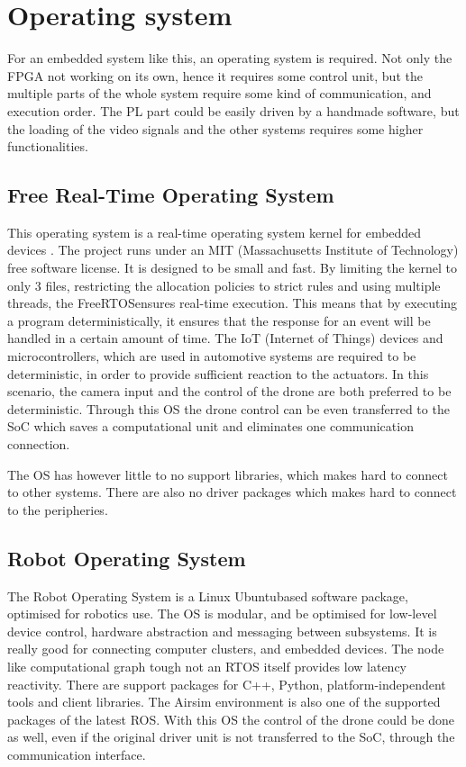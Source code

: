 \section{Operating system} %
For an embedded system like this, an operating system is required.
Not only the FPGA not working on its own, hence it requires some control unit, but the multiple parts of the whole system require some kind of communication, and execution order.
The PL part could be easily driven by a handmade software, but the loading of the video signals and the other systems requires some higher functionalities.

\subsection{Free Real-Time Operating System} %
This operating system is a real-time operating system kernel for embedded devices \cite{FreeROTS}.
The project runs under an MIT (Massachusetts Institute of Technology) free software license.
It is designed to be small and fast.
By limiting the kernel to only 3 files, restricting the allocation policies to strict rules and using multiple threads, the FreeRTOS\texttrademark ensures real-time execution.
This means that by executing a program deterministically, it ensures that the response for an event will be handled in a certain amount of time.
The IoT (Internet of Things) devices and microcontrollers, which are used in automotive systems are required to be deterministic, in order to provide sufficient reaction to the actuators.
In this scenario, the camera input and the control of the drone are both preferred to be deterministic.
Through this OS the drone control can be even transferred to the SoC which saves a computational unit and eliminates one communication connection.

The OS has however little to no support libraries, which makes hard to connect to other systems.
There are also no driver packages which makes hard to connect to the peripheries.

\subsection{Robot Operating System} %
The Robot Operating System\texttrademark \cite{ROS} is a Linux Ubuntu\texttrademark based software package, optimised for robotics use.
The OS is modular, and be optimised for low-level device control, hardware abstraction and messaging between subsystems.
It is really good for connecting computer clusters, and embedded devices.
The node like computational graph tough not an RTOS itself provides low latency reactivity.
There are support packages for C++, Python, platform-independent tools and client libraries.
The Airsim environment is also one of the supported packages of the latest ROS.
With this OS the control of the drone could be done as well, even if the original driver unit is not transferred to the SoC, through the communication interface.

